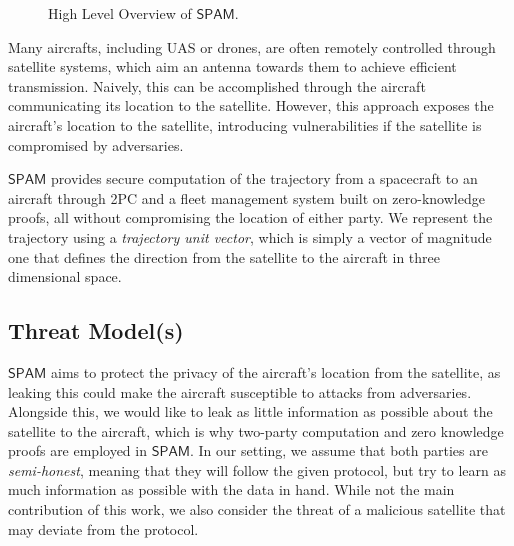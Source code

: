 \documentclass[9pt,sigconf,screen]{acmart}
\newcommand{\nasimeh}[1]{\textcolor{purple}{{\sf (NH:} {\sl{#1})}}}
\newcommand\sys{$\mathsf{SPAM}$\xspace}
\begin{document}
\begin{figure*}[t]
\centering
{}
\hspace{1em}
\caption{High Level Overview of \sys.}
\label{fig:system}
\end{figure*}

Many aircrafts, including UAS or drones, are often remotely controlled through satellite systems, which aim an antenna towards them  to achieve efficient transmission. Naively, this can be accomplished through the aircraft communicating its location to the satellite.  However,  this approach exposes the aircraft's location to the satellite, introducing vulnerabilities  if the satellite is compromised by adversaries. 

\sys provides secure computation of the trajectory from a spacecraft to an aircraft through 2PC and a fleet management system built on zero-knowledge proofs, all without compromising the location of either party. We represent the trajectory using a \textit{trajectory unit vector}, which is simply a vector of magnitude one that defines the direction from the satellite to the aircraft in three dimensional space.



\subsection{Threat Model(s)}

\sys aims to protect the privacy of the aircraft's location from the satellite, as leaking this could make the aircraft susceptible to attacks from adversaries. Alongside this, we would like to leak as little information as possible about the satellite to the aircraft, which is why two-party computation and zero knowledge proofs are employed in \sys. In our setting, we assume that both parties are \textit{semi-honest}, meaning that they will follow the given protocol, but try to learn as much information as possible with the data in hand. While not the main contribution of this work, we also consider the threat of a malicious satellite that may deviate from the protocol.
\end{document}
